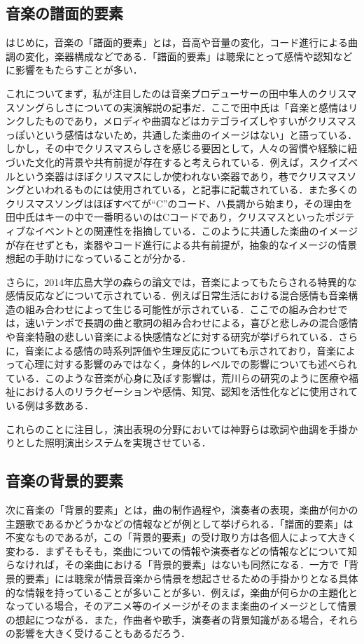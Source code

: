 \subsection{音楽の譜面的要素}\label{sec:music_factor1}
はじめに，音楽の「譜面的要素」とは，音高や音量の変化，コード進行による曲調の変化，楽器構成などである．「譜面的要素」は聴衆にとって感情や認知などに影響をもたらすことが多い．

これについてまず，私が注目したのは音楽プロデューサーの田中隼人のクリスマスソングらしさについての実演解説の記事だ\cite{xmassong}．ここで田中氏は「音楽と感情はリンクしたものであり，メロディや曲調などはカテゴライズしやすいがクリスマスっぽいという感情はないため，共通した楽曲のイメージはない」と語っている．しかし，その中でクリスマスらしさを感じる要因として，人々の習慣や経験に紐づいた文化的背景や共有前提が存在すると考えられている．例えば，スクイズベルという楽器はほぼクリスマスにしか使われない楽器であり，巷でクリスマスソングといわれるものには使用されている，と記事に記載されている．また多くのクリスマスソングはほぼすべてが“C”のコード、ハ長調から始まり，その理由を田中氏はキーの中で一番明るいのはCコードであり，クリスマスといったポジティブなイベントとの関連性を指摘している．このように共通した楽曲のイメージが存在せずとも，楽器やコード進行による共有前提が，抽象的なイメージの情景想起の手助けになっていることが分かる．

さらに，2014年広島大学の森らの論文では，音楽によってもたらされる特異的な感情反応などについて示されている\cite{Mori14}．例えば日常生活における混合感情も音楽構造の組み合わせによって生じる可能性が示されている．ここでの組み合わせでは，速いテンポで長調の曲と歌詞の組み合わせによる，喜びと悲しみの混合感情や音楽特融の悲しい音楽による快感情などに対する研究が挙げられている．さらに，音楽による感情の時系列評価や生理反応についても示されており，音楽によって心理に対する影響のみではなく，身体的レベルでの影響についても述べられている．このような音楽が心身に及ぼす影響は，荒川らの研究のように医療や福祉における人のリラクゼーションや感情、知覚、認知を活性化などに使用されている例は多数ある\cite{Arakawa96}．

これらのことに注目し，演出表現の分野においては神野らは歌詞や曲調を手掛かりとした照明演出システムを実現させている\cite{Kanno22}．

\subsection{音楽の背景的要素}
次に音楽の「背景的要素」とは，曲の制作過程や，演奏者の表現，楽曲が何かの主題歌であるかどうかなどの情報などが例として挙げられる．「譜面的要素」は不変なものであるが，この「背景的要素」の受け取り方は各個人によって大きく変わる．まずそもそも，楽曲についての情報や演奏者などの情報などについて知らなければ，その楽曲における「背景的要素」はないも同然になる．一方で「背景的要素」には聴衆が情景音楽から情景を想起させるための手掛かりとなる具体的な情報を持っていることが多いことが多い．例えば，楽曲が何らかの主題化となっている場合，そのアニメ等のイメージがそのまま楽曲のイメージとして情景の想起につながる．また，作曲者や歌手，演奏者の背景知識がある場合，それらの影響を大きく受けることもあるだろう．

